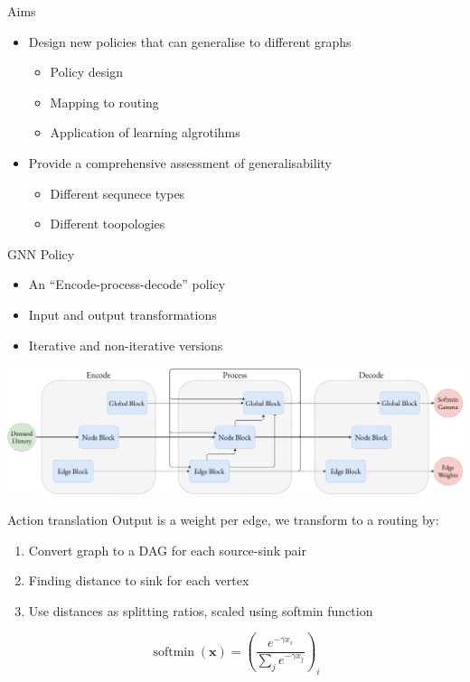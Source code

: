 \documentclass{beamer}
\begin{document}
\begin{frame}{Aims}
  \begin{itemize}
    \item Design new policies that can generalise to different graphs
      \begin{itemize}
        \item Policy design
        \item Mapping to routing
        \item Application of learning algrotihms
      \end{itemize}
    \item Provide a comprehensive assessment of generalisability
      \begin{itemize}
        \item Different sequnece types
        \item Different toopologies
      \end{itemize}
  \end{itemize}
\end{frame}

\begin{frame}{GNN Policy}
  \begin{itemize}
    \item An ``Encode-process-decode''\cite{battaglia2018relational} policy
    \item Input and output transformations
    \item Iterative and non-iterative versions
  \end{itemize}
  \vspace{2em}
  \includegraphics[width=\textwidth]{figures/encode_process_decode.pdf}
\end{frame}

\begin{frame}{Action translation}
  Output is a weight per edge, we transform to a routing by:
  \begin{enumerate}
    \item Convert graph to a DAG for each source-sink pair
    \item Finding distance to sink for each vertex
    \item Use distances as splitting ratios, scaled using softmin function
  \end{enumerate}
  
  $$\operatorname{softmin}(\mathbf{x}) = \left( \frac{e^{- \gamma x_i}}{\sum_j{e^{- \gamma x_j}}} \right)_i$$
\end{frame}
\end{document}
